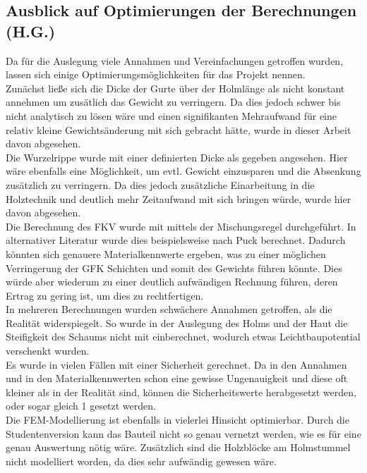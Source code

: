 \subsection{Ausblick auf Optimierungen der Berechnungen (H.G.)}
Da für die Auslegung viele Annahmen und Vereinfachungen getroffen wurden, lassen sich einige Optimierungsmöglichkeiten für das Projekt nennen.\\
\noindent
Zunächst ließe sich die Dicke der Gurte über der Holmlänge als nicht konstant annehmen um zusätlich das Gewicht zu verringern. Da dies jedoch schwer bis nicht analytisch zu lösen wäre und einen signifikanten Mehraufwand für eine relativ kleine Gewichtsänderung mit sich gebracht hätte, wurde in dieser Arbeit davon abgesehen.\\
\noindent
Die Wurzelrippe wurde mit einer definierten Dicke als gegeben angesehen. Hier wäre ebenfalls eine Möglichkeit, um evtl. Gewicht einzusparen und die Absenkung zusätzlich zu verringern. Da dies jedoch zusätzliche Einarbeitung in die Holztechnik und deutlich mehr Zeitaufwand mit sich bringen würde, wurde hier davon abgesehen.\\
\noindent
Die Berechnung des FKV wurde mit mittels der Mischungsregel durchgeführt. In alternativer Literatur wurde dies beispielsweise nach Puck berechnet. Dadurch könnten sich genauere Materialkennwerte ergeben, was zu einer möglichen Verringerung der GFK Schichten und somit des Gewichts führen könnte. Dies würde aber wiederum zu einer deutlich aufwändigen Rechnung führen, deren Ertrag zu gering ist, um dies zu rechtfertigen.\\
\noindent
In mehreren Berechnungen wurden schwächere Annahmen getroffen, als die Realität widerspiegelt. So wurde in der Auslegung des Holms und der Haut die Steifigkeit des Schaums nicht mit einberechnet, wodurch etwas Leichtbaupotential verschenkt wurden.\\
\noindent
Es wurde in vielen Fällen mit einer Sicherheit gerechnet. Da in den Annahmen und in den Materialkennwerten schon eine gewisse Ungenauigkeit und diese oft kleiner als in der Realität sind, können die Sicherheitswerte herabgesetzt werden, oder sogar gleich 1 gesetzt werden.\\
\noindent
Die FEM-Modellierung ist ebenfalls in vielerlei Hinsicht optimierbar. Durch die Studentenversion kann das Bauteil nicht so genau vernetzt werden, wie es für eine genau Auswertung nötig wäre. Zusätzlich sind die Holzblöcke am Holmstummel nicht modelliert worden, da dies sehr aufwändig gewesen wäre.\\
\noindent
 
